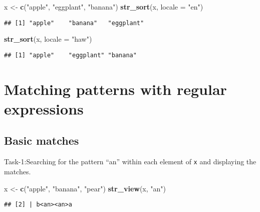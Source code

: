 \documentclass[
]{article}
\newenvironment{Shaded}{\begin{snugshade}}{\end{snugshade}}
\newcommand{\AttributeTok}[1]{\textcolor[rgb]{0.13,0.29,0.53}{#1}}
\newcommand{\FunctionTok}[1]{\textcolor[rgb]{0.13,0.29,0.53}{\textbf{#1}}}
\newcommand{\NormalTok}[1]{#1}
\newcommand{\OtherTok}[1]{\textcolor[rgb]{0.56,0.35,0.01}{#1}}
\newcommand{\StringTok}[1]{\textcolor[rgb]{0.31,0.60,0.02}{#1}}
\begin{document}
\begin{Shaded}
\begin{Highlighting}[]
\NormalTok{x }\OtherTok{\textless{}{-}} \FunctionTok{c}\NormalTok{(}\StringTok{"apple"}\NormalTok{, }\StringTok{"eggplant"}\NormalTok{, }\StringTok{"banana"}\NormalTok{)}
\FunctionTok{str\_sort}\NormalTok{(x, }\AttributeTok{locale =} \StringTok{"en"}\NormalTok{) }
\end{Highlighting}
\end{Shaded}

\begin{verbatim}
## [1] "apple"    "banana"   "eggplant"
\end{verbatim}

\begin{Shaded}
\begin{Highlighting}[]
\FunctionTok{str\_sort}\NormalTok{(x, }\AttributeTok{locale =} \StringTok{"haw"}\NormalTok{) }
\end{Highlighting}
\end{Shaded}

\begin{verbatim}
## [1] "apple"    "eggplant" "banana"
\end{verbatim}

\hypertarget{matching-patterns-with-regular-expressions}{%
\section{Matching patterns with regular
expressions}\label{matching-patterns-with-regular-expressions}}

\hypertarget{basic-matches}{%
\subsection{Basic matches}\label{basic-matches}}

Task-1:Searching for the pattern ``an'' within each element of
\texttt{x} and displaying the matches.

\begin{Shaded}
\begin{Highlighting}[]
\NormalTok{x }\OtherTok{\textless{}{-}} \FunctionTok{c}\NormalTok{(}\StringTok{"apple"}\NormalTok{, }\StringTok{"banana"}\NormalTok{, }\StringTok{"pear"}\NormalTok{)}
\FunctionTok{str\_view}\NormalTok{(x, }\StringTok{"an"}\NormalTok{)}
\end{Highlighting}
\end{Shaded}

\begin{verbatim}
## [2] | b<an><an>a
\end{verbatim}
\end{document}
